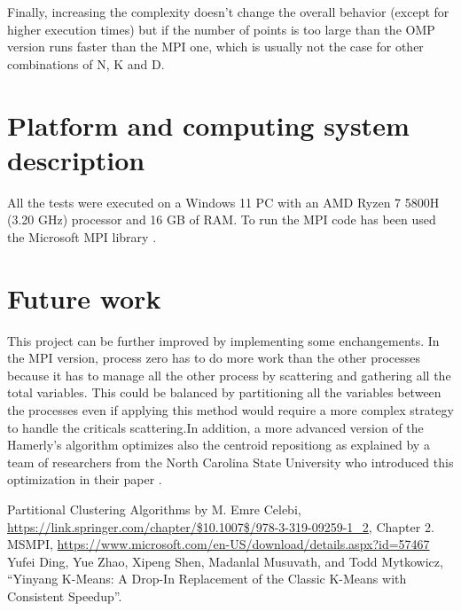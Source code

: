 \documentclass[conference]{IEEEtran}
\begin{document}
Finally, increasing the complexity doesn't change the overall behavior (except for higher execution times) but if the number of points is too large than the OMP version runs faster than the MPI one, which is usually not the case for other combinations of N, K and D.

\section{Platform and computing system description}
All the tests were executed on a Windows 11 PC with an AMD Ryzen 7 5800H (3.20 GHz) processor and 16 GB of RAM. To run the MPI code has been used the Microsoft MPI library \cite{b2}.

\section{Future work}
This project can be further improved by implementing some enchangements.
In the MPI version, process zero has to do more work than the other processes because it has to manage all the other process by scattering and gathering all the total variables. This could be balanced by partitioning all the variables between the processes even if applying this method would require a more complex strategy to handle the criticals scattering.In addition, a more advanced version of the Hamerly's algorithm optimizes also the centroid repositiong as explained by a team of researchers from the North Carolina State University who introduced this optimization in their paper \cite{b3} .

\begin{thebibliography}{00}
   Partitional Clustering Algorithms by M. Emre Celebi, \url{https://link.springer.com/chapter/$10.1007$/978-3-319-09259-1_2}, Chapter 2.
   MSMPI, \url{https://www.microsoft.com/en-US/download/details.aspx?id=57467}
   Yufei Ding, Yue Zhao, Xipeng Shen, Madanlal Musuvath,  and Todd Mytkowicz, ``Yinyang K-Means: A Drop-In Replacement of the Classic K-Means with Consistent Speedup''.
\end{thebibliography}
\end{document}

